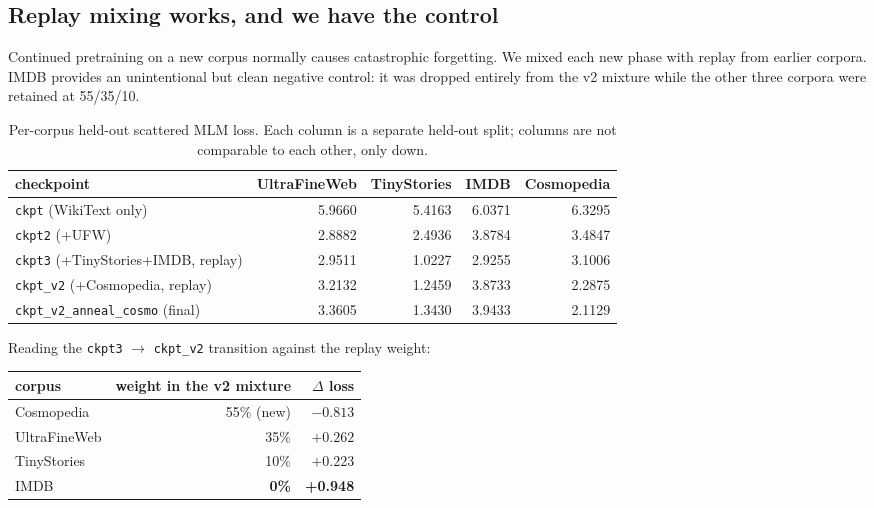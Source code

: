 \documentclass[11pt,a4paper]{article}
\begin{document}
\subsection{Replay mixing works, and we have the control}

Continued pretraining on a new corpus normally causes catastrophic forgetting. We mixed each
new phase with replay from earlier corpora. IMDB provides an unintentional but clean negative
control: it was dropped entirely from the v2 mixture while the other three corpora were
retained at 55/35/10.

\begin{table}[H]
\centering\small
\begin{tabular}{lrrrr}
\toprule
checkpoint & UltraFineWeb & TinyStories & IMDB & Cosmopedia \\
\midrule
\texttt{ckpt}  (WikiText only)          & 5.9660 & 5.4163 & 6.0371 & 6.3295 \\
\texttt{ckpt2} (+UFW)                   & 2.8882 & 2.4936 & 3.8784 & 3.4847 \\
\texttt{ckpt3} (+TinyStories+IMDB, replay) & 2.9511 & 1.0227 & 2.9255 & 3.1006 \\
\texttt{ckpt\_v2} (+Cosmopedia, replay) & 3.2132 & 1.2459 & 3.8733 & 2.2875 \\
\texttt{ckpt\_v2\_anneal\_cosmo} (final)& 3.3605 & 1.3430 & 3.9433 & 2.1129 \\
\bottomrule
\end{tabular}
\caption{Per-corpus held-out scattered MLM loss. Each column is a separate held-out split;
columns are not comparable to each other, only down.}
\end{table}

Reading the \texttt{ckpt3} $\to$ \texttt{ckpt\_v2} transition against the replay weight:

\begin{center}\small
\begin{tabular}{lrr}
\toprule
corpus & weight in the v2 mixture & $\Delta$ loss \\
\midrule
Cosmopedia    & 55\% (new)       & $-0.813$ \\
UltraFineWeb  & 35\%             & $+0.262$ \\
TinyStories   & 10\%             & $+0.223$ \\
IMDB          & \textbf{0\%}     & \textbf{+0.948} \\
\bottomrule
\end{tabular}
\end{center}
\end{document}
